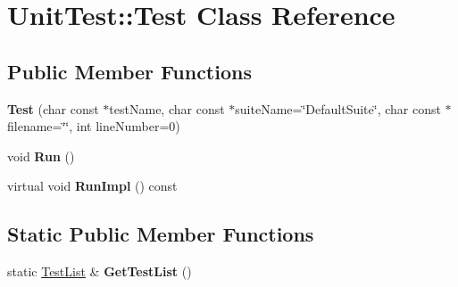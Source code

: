 \hypertarget{classUnitTest_1_1Test}{\section{Unit\-Test\-:\-:Test Class Reference}
\label{classUnitTest_1_1Test}
}
\subsection*{Public Member Functions}
\begin{DoxyCompactItemize}
\item 
\hypertarget{classUnitTest_1_1Test_a8c9765840746f8ddae4a2a52e0a50ec1}{{\bfseries Test} (char const $\ast$test\-Name, char const $\ast$suite\-Name=\char`\"{}Default\-Suite\char`\"{}, char const $\ast$filename=\char`\"{}\char`\"{}, int line\-Number=0)}\label{classUnitTest_1_1Test_a8c9765840746f8ddae4a2a52e0a50ec1}

\item 
\hypertarget{classUnitTest_1_1Test_a8b266c253b945d9552c56012a96a55a2}{void {\bfseries Run} ()}\label{classUnitTest_1_1Test_a8b266c253b945d9552c56012a96a55a2}

\item 
\hypertarget{classUnitTest_1_1Test_ab3b4389b30d08742a21ab59948c84bc0}{virtual void {\bfseries Run\-Impl} () const }\label{classUnitTest_1_1Test_ab3b4389b30d08742a21ab59948c84bc0}

\end{DoxyCompactItemize}
\subsection*{Static Public Member Functions}
\begin{DoxyCompactItemize}
\item 
\hypertarget{classUnitTest_1_1Test_aaccabd8329843c5400a40b50d0dd9b50}{static \hyperlink{classUnitTest_1_1TestList}{Test\-List} \& {\bfseries Get\-Test\-List} ()}\label{classUnitTest_1_1Test_aaccabd8329843c5400a40b50d0dd9b50}

\end{DoxyCompactItemize}
